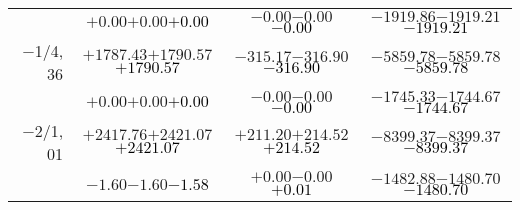 \documentclass[compress]{beamer}
\begin{document}
\begin{frame}
{\begin{tabular}{r | c | c | c}
           & $+0.00$\hspace{0.1 cm}$+0.00$\hspace{0.1 cm}\textcolor{black}{$+0.00$} & $-0.00$\hspace{0.1 cm}$-0.00$\hspace{0.1 cm}\textcolor{black}{$-0.00$} & $-1919.86$\hspace{0.1 cm}$-1919.21$\hspace{0.1 cm}\textcolor{black}{$-1919.21$} \\
$-$1/4, 36 & $+1787.43$\hspace{0.1 cm}$+1790.57$\hspace{0.1 cm}\textcolor{black}{$+1790.57$} & $-315.17$\hspace{0.1 cm}$-316.90$\hspace{0.1 cm}\textcolor{black}{$-316.90$} & $-5859.78$\hspace{0.1 cm}$-5859.78$\hspace{0.1 cm}\textcolor{black}{$-5859.78$} \\
           & $+0.00$\hspace{0.1 cm}$+0.00$\hspace{0.1 cm}\textcolor{black}{$+0.00$} & $-0.00$\hspace{0.1 cm}$-0.00$\hspace{0.1 cm}\textcolor{black}{$-0.00$} & $-1745.33$\hspace{0.1 cm}$-1744.67$\hspace{0.1 cm}\textcolor{black}{$-1744.67$} \\
$-$2/1, 01 & $+2417.76$\hspace{0.1 cm}$+2421.07$\hspace{0.1 cm}\textcolor{black}{$+2421.07$} & $+211.20$\hspace{0.1 cm}$+214.52$\hspace{0.1 cm}\textcolor{black}{$+214.52$} & $-8399.37$\hspace{0.1 cm}$-8399.37$\hspace{0.1 cm}\textcolor{black}{$-8399.37$} \\
           & $-1.60$\hspace{0.1 cm}$-1.60$\hspace{0.1 cm}\textcolor{black}{$-1.58$} & $+0.00$\hspace{0.1 cm}$-0.00$\hspace{0.1 cm}\textcolor{black}{$+0.01$} & $-1482.88$\hspace{0.1 cm}$-1480.70$\hspace{0.1 cm}\textcolor{black}{$-1480.70$} \\

\end{tabular}}
\end{frame}
\end{document}
